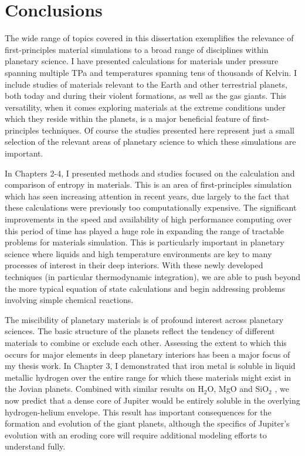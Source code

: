 \chapter{Conclusions}\label{chap9}

The wide range of topics covered in this dissertation exemplifies the relevance of
first-principles material simulations to a broad range of disciplines within
planetary science. I have presented calculations for materials under pressure
spanning multiple TPa and temperatures spanning tens of thousands of Kelvin. I
include studies of materials relevant to the Earth and other terrestrial planets,
both today and during their violent formations, as well as the gas giants. This
versatility, when it comes exploring materials at the extreme conditions under which
they reside within the planets, is a major beneficial feature of first-principles
techniques. Of course the studies presented here represent just a small selection of
the relevant areas of planetary science to which these simulations are important.

In Chapters 2-4, I presented methods and studies focused on the calculation and
comparison of entropy in materials. This is an area of first-principles simulation
which has seen increasing attention in recent years, due largely to the fact that
these calculations were previously too computationally expensive. The significant improvements in
the speed and availability of high performance computing over this period of time has
played a huge role in expanding the range of tractable problems for materials
simulation. This is particularly important in planetary science where liquids and
high temperature environments are key to many processes of interest in their deep
interiors. With these newly developed techniques (in particular thermodynamic
integration), we are able to push beyond the more typical equation of state
calculations and begin addressing problems involving simple chemical reactions.

The miscibility of planetary materials is of profound interest across planetary
sciences. The basic structure of the planets reflect the tendency of different
materials to combine or exclude each other. Assessing the extent to which this occurs
for major elements in deep planetary interiors has been a major focus of my thesis
work. In Chapter 3, I demonstrated that iron metal is soluble in liquid metallic
hydrogen over the entire range for which these materials might exist in the Jovian
planets.  Combined with similar results on H$_2$O, MgO and SiO$_2$
\citep{Wilson2012a,wilson12b,Gonzalez2013}, we now predict that a dense core of Jupiter
would be entirely soluble in the overlying hydrogen-helium envelope. This result has
important consequences for the formation and evolution of the giant planets, although
the specifics of Jupiter's evolution with an eroding core will require additional
modeling efforts to understand fully. 

